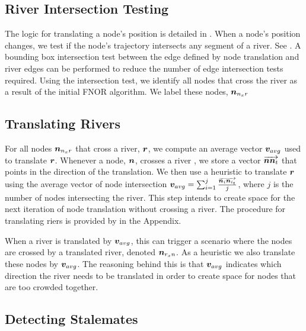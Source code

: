 \subsection{River Intersection Testing}

The logic for translating a node's position is detailed in . When a node's position changes, we test if the node's trajectory intersects any segment of a river. See . A bounding box intersection test between the edge defined by node translation and river edges can be performed to reduce the number of edge intersection tests required. Using the intersection test, we identify all nodes that cross the river as a result of the initial FNOR algorithm. We label these nodes, $ \bm{n}_{n_{x}r} $

\subsection{Translating Rivers}

For all nodes $ \bm{n}_{n_{x}r} $ that cross a river, $ \bm{r} $, we compute an average vector $ \bm{v}_{avg} $ used to translate $ \bm{r} $. Whenever a node, $ \bm{n} $, crosses a river , we store a vector $ \protect\overrightarrow{\bm{n}\bm{n}_{t}} $ that points in the direction of the translation. We then use a heuristic to translate $ \bm{r} $ using the average vector of node intersection $ \bm{v}_{avg} = \sum_{i=1}^j \frac{\protect\overrightarrow{\bm{n}_i\bm{n}_{i_t}}}{j} $, where $ j $ is the number of nodes intersecting the river. This step intends to create space for the next iteration of node translation without crossing a river. The procedure for translating riers is provided by  in the Appendix.

When a river is translated by $ \bm{v}_{avg} $, this can trigger a scenario where the nodes are crossed by a translated river, denoted $ \bm{n}_{r_{x}n} $. As a heuristic we also translate these nodes by $ \bm{v}_{avg} $. The reasoning behind this is that $ \bm{v}_{avg} $ indicates which direction the river needs to be translated in order to create space for nodes that are too crowded together.

\subsection{Detecting Stalemates}

